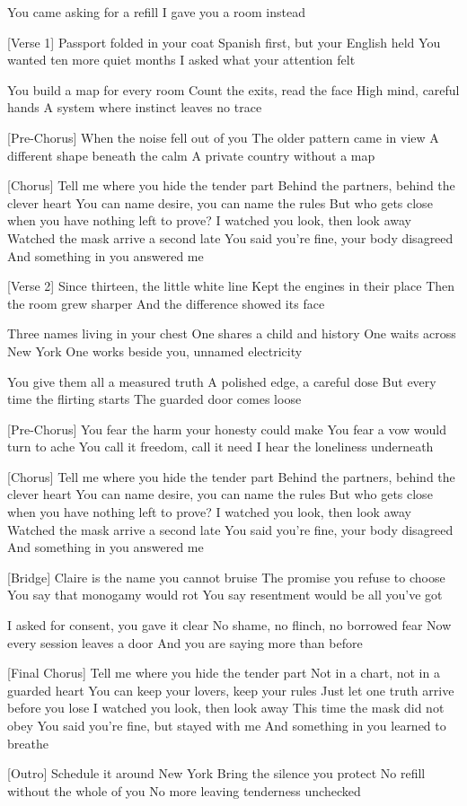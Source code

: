 \begin{lyrics}
[Intro]
You came asking for a refill
I gave you a room instead

[Verse 1]
Passport folded in your coat
Spanish first, but your English held
You wanted ten more quiet months
I asked what your attention felt

You build a map for every room
Count the exits, read the face
High mind, careful hands
A system where instinct leaves no trace

[Pre-Chorus]
When the noise fell out of you
The older pattern came in view
A different shape beneath the calm
A private country without a map

[Chorus]
Tell me where you hide the tender part
Behind the partners, behind the clever heart
You can name desire, you can name the rules
But who gets close when you have nothing left to prove?
I watched you look, then look away
Watched the mask arrive a second late
You said you’re fine, your body disagreed
And something in you answered me

[Verse 2]
Since thirteen, the little white line
Kept the engines in their place
Then the room grew sharper
And the difference showed its face

Three names living in your chest
One shares a child and history
One waits across New York
One works beside you, unnamed electricity

You give them all a measured truth
A polished edge, a careful dose
But every time the flirting starts
The guarded door comes loose

[Pre-Chorus]
You fear the harm your honesty could make
You fear a vow would turn to ache
You call it freedom, call it need
I hear the loneliness underneath

[Chorus]
Tell me where you hide the tender part
Behind the partners, behind the clever heart
You can name desire, you can name the rules
But who gets close when you have nothing left to prove?
I watched you look, then look away
Watched the mask arrive a second late
You said you’re fine, your body disagreed
And something in you answered me

[Bridge]
Claire is the name you cannot bruise
The promise you refuse to choose
You say that monogamy would rot
You say resentment would be all you’ve got

I asked for consent, you gave it clear
No shame, no flinch, no borrowed fear
Now every session leaves a door
And you are saying more than before

[Final Chorus]
Tell me where you hide the tender part
Not in a chart, not in a guarded heart
You can keep your lovers, keep your rules
Just let one truth arrive before you lose
I watched you look, then look away
This time the mask did not obey
You said you’re fine, but stayed with me
And something in you learned to breathe

[Outro]
Schedule it around New York
Bring the silence you protect
No refill without the whole of you
No more leaving tenderness unchecked
\end{lyrics}

